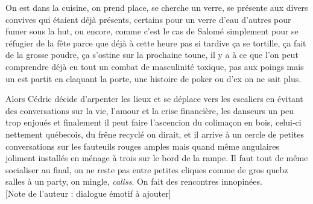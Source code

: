 On est dans la cuisine, on prend place, se cherche un verre, se présente
aux divers convives qui étaient déjà présents, certains pour un verre d'eau
d'autres pour fumer sous la hut, ou encore, comme c'est le cas de Salomé
simplement pour se réfugier de la fête parce que déjà à cette heure pas si
tardive  ça se tortille, ça fait de la grosse poudre, ça s'ostine sur la
prochaine toune, il y a à ce que l'on peut comprendre déjà eu tout 
un combat de masculinité toxique, pas aux poings mais un est partit en claquant
la porte, une histoire de poker ou d'ex on ne sait plus. 

Alors Cédric décide d'arpenter les lieux et se déplace vers les escaliers 
en évitant des conversations sur la vie, l'amour et la crise financière,
les danseurs un peu trop enjoués et finalement il peut faire l'ascencion du 
colimaçon en bois, celui-ci nettement québecois, du frêne recyclé on dirait,
et il arrive à un cercle de petites conversations sur les fauteuils rouges
amples mais quand même angulaires joliment installés en ménage à trois sur le
bord de la rampe. Il faut tout de même socialiser au final,
on ne reste pas entre petites cliques comme de gros quebz salles à un party, on
mingle, \emph{caliss}. On fait des
rencontres innopinées.
\\

[Note de l'auteur : dialogue émotif à ajouter]\\[2em]

